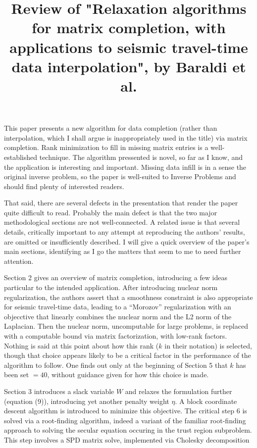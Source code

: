 \title{Review of  "Relaxation algorithms for matrix completion, with applications to seismic travel-time data interpolation", by Baraldi et al.}
\date{}
\author{}

\righthead{}

\maketitle
\parskip 12pt
 

This paper presents a new algorithm for data completion (rather than interpolation, which I shall argue is inappropriately used in the title) via matrix completion. Rank minimization to fill in missing matrix entries is a well-established technique. The algorithm pressented is novel, so far as I know, and the application is interesting and important. Missing data infill is in a sense the original inverse problem, so the paper is well-suited to Inverse Problems and should find plenty of interested readers.

That said, there are several defects in the presentation that render the paper quite difficult to read. Probably the main defect is that the two major methodological sections are not well-connected. A related issue is that several details, critically important to any attempt at reproducing the authors' results, are omitted or insufficiently described. I will give a quick overview of the paper's main sections, identifying as I go the matters that seem to me to need further attention.

Section 2 gives an overview of matrix completion, introducing a few ideas particular to the intended application. After introducing nuclear norm regularization, the authors assert that a smoothness constraint is also appropriate for seismic travel-time data, leading to a ``Morozov'' regularization with an objecctive that linearly combines the nuclear norm and the L2 norm of the Laplacian. Then the nuclear norm, uncomputable for large problems, is replaced with a computable bound via matrix factorization, with low-rank factors. Nothing is said at this point about how this rank ($k$ in their notation) is selected, though that choice appears likely to be a critical factor in the performance of the algorithm to follow. One finds out only at the beginning of Section 5 that $k$ has been set $=40$, without guidance given for how this choice is made. 

Section 3 introduces a slack variable $W$ and relaxes the formulation further (equation (9)), introducing yet another penalty weight $\eta$. A block coordinate descent algorithm is introduced to minimize this objective. The critical step 6 is solved via a root-finding algorithm, indeed a variant of the familiar root-finding approach to solving the secular equation occuring in the trust region subproblem. This step involves a SPD matrix solve, implemented via Cholesky decomposition

